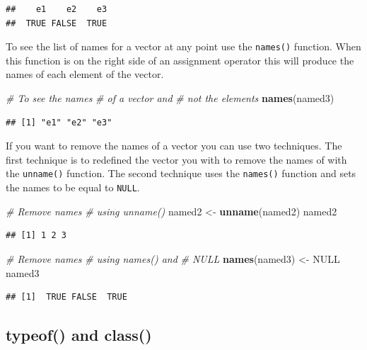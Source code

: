 \documentclass[
]{book}
\newenvironment{Shaded}{\begin{snugshade}}{\end{snugshade}}
\newcommand{\CommentTok}[1]{\textcolor[rgb]{0.56,0.35,0.01}{\textit{#1}}}
\newcommand{\KeywordTok}[1]{\textcolor[rgb]{0.13,0.29,0.53}{\textbf{#1}}}
\newcommand{\NormalTok}[1]{#1}
\newcommand{\OtherTok}[1]{\textcolor[rgb]{0.56,0.35,0.01}{#1}}
\newcommand{\StringTok}[1]{\textcolor[rgb]{0.31,0.60,0.02}{#1}}
\begin{document}
\begin{verbatim}
##    e1    e2    e3 
##  TRUE FALSE  TRUE
\end{verbatim}

To see the list of names for a vector at any point use the \texttt{names()} function. When this function is on the right side of an assignment operator this will produce the names of each element of the vector.

\begin{Shaded}
\begin{Highlighting}[]
\CommentTok{# To see the names}
\CommentTok{# of a vector and}
\CommentTok{# not the elements}
\KeywordTok{names}\NormalTok{(named3)}
\end{Highlighting}
\end{Shaded}

\begin{verbatim}
## [1] "e1" "e2" "e3"
\end{verbatim}

If you want to remove the names of a vector you can use two techniques. The first technique is to redefined the vector you with to remove the names of with the \texttt{unname()} function. The second technique uses the \texttt{names()} function and sets the names to be equal to \texttt{NULL}.

\begin{Shaded}
\begin{Highlighting}[]
\CommentTok{# Remove names}
\CommentTok{# using unname()}
\NormalTok{named2 <-}\StringTok{ }\KeywordTok{unname}\NormalTok{(named2)}
\NormalTok{named2}
\end{Highlighting}
\end{Shaded}

\begin{verbatim}
## [1] 1 2 3
\end{verbatim}

\begin{Shaded}
\begin{Highlighting}[]
\CommentTok{# Remove names}
\CommentTok{# using names() and}
\CommentTok{# NULL}
\KeywordTok{names}\NormalTok{(named3) <-}\StringTok{ }\OtherTok{NULL}
\NormalTok{named3}
\end{Highlighting}
\end{Shaded}

\begin{verbatim}
## [1]  TRUE FALSE  TRUE
\end{verbatim}

\hypertarget{typeof-and-class}{%
\subsection{typeof() and class()}\label{typeof-and-class}}
\end{document}
